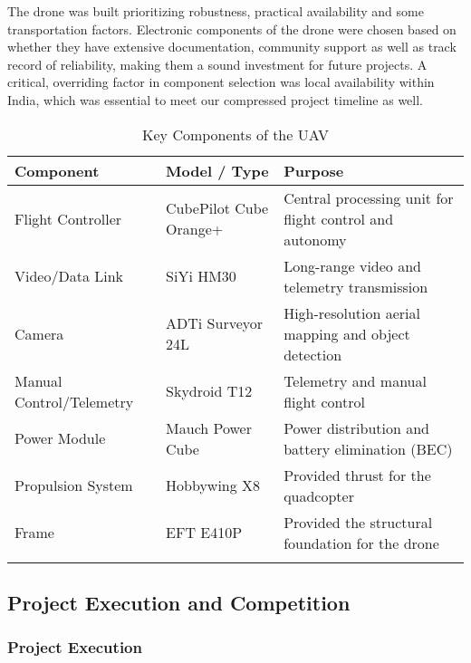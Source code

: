 The drone was built prioritizing robustness, practical availability and some transportation factors. Electronic components of the drone were chosen based on whether they have extensive documentation, community support as well as track record of reliability, making them a sound investment for future projects. A critical, overriding factor in component selection was local availability within India, which was essential to meet our compressed project timeline as well.

\vspace*{-1cm}
\begin{longtable}[h!]{|l|l|p{5cm}|} \hline
	\textbf{Component}       & \textbf{Model / Type}       & \textbf{Purpose}                                        \\ \hline
	Flight Controller        & CubePilot Cube Orange+      & Central processing unit for flight control and autonomy \\ \hline
	Video/Data Link          & SiYi HM30                   & Long-range video and telemetry transmission             \\ \hline
	Camera   & ADTi Surveyor 24L           & High-resolution aerial mapping and object detection     \\ \hline
	Manual Control/Telemetry & Skydroid T12                & Telemetry and manual flight control           \\ \hline
	Power Module             & Mauch Power Cube            & Power distribution and battery elimination (BEC)        \\ \hline
	Propulsion System        & Hobbywing X8                & Provided thrust for the quadcopter                      \\ \hline
	Frame                    & EFT E410P  & Provided the structural foundation for the drone        \\ \hline
	\caption{Key Components of the UAV}
\end{longtable}


\subsection{Project Execution and Competition}

\subsubsection{Project Execution}

